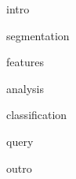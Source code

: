 


{intro}

{segmentation}

{features}


{analysis}

{classification}

{query}

{outro}














